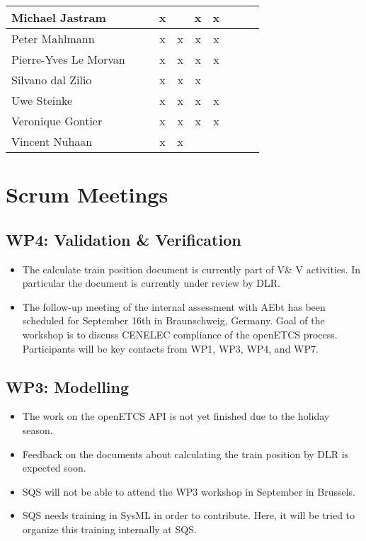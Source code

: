 \documentclass[a4paper, 11pt]{article}
\begin{document}
\begin{tabular}{|l|c|c|c||c|c|c||c|c|c|}
Michael Jastram      &   &   & x  &  & x & x \\\hline
Peter Mahlmann       &   &   & x & x & x & x \\\hline
Pierre-Yves Le Morvan&   &  & x & x & x & x \\\hline
Silvano dal Zilio    &   &   & x & x & x &  \\\hline
Uwe Steinke          &  &  & x & x & x & x \\\hline
Veronique Gontier    &  &  & x & x & x & x \\\hline
Vincent Nuhaan       &   &   & x & x &   &   \\\hline
\end{tabular}


\section{Scrum Meetings}



\subsection{WP4: Validation \& Verification}
\begin{itemize}
\item The calculate train position document is currently part of V\& V activities. In particular the document is currently under review by DLR.
\item The follow-up meeting of the internal assessment with AEbt has been scheduled for September 16th in Braunschweig, Germany. Goal of the workshop is to discuss CENELEC compliance of the openETCS process. Participants will be key contacts from WP1, WP3, WP4, and WP7.

\end{itemize}

\subsection{WP3: Modelling}
\begin{itemize}
\item The work on the openETCS API is not yet finished due to the holiday season.
\item Feedback on the documents about calculating the train position by DLR is expected soon.
\item SQS will not be able to attend the WP3 workshop in September in Brussels.
\item SQS needs training in SysML in order to contribute. Here, it will be tried to organize this training internally at SQS.
\end{itemize}
\end{document}
